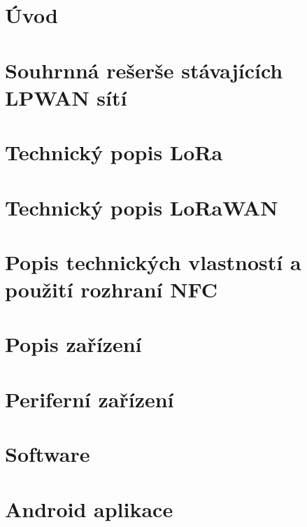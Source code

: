 \documentclass[czech,bachelor]{diploma}
\begin{document}
\MakeTitlePages


\listoffigures
\clearpage

\listoftables
\clearpage

\chapter{Úvod}



\chapter{Souhrnná rešerše stávajících LPWAN sítí}



\chapter{Technický popis LoRa}



\chapter{Technický popis LoRaWAN}



\chapter{Popis technických vlastností a použití rozhraní NFC}



\chapter{Popis zařízení}





\chapter{Periferní zařízení}



\chapter{Software}



\chapter{Android aplikace}



\printbibliography[title={Literatura}, heading=bibintoc]
\end{document}
